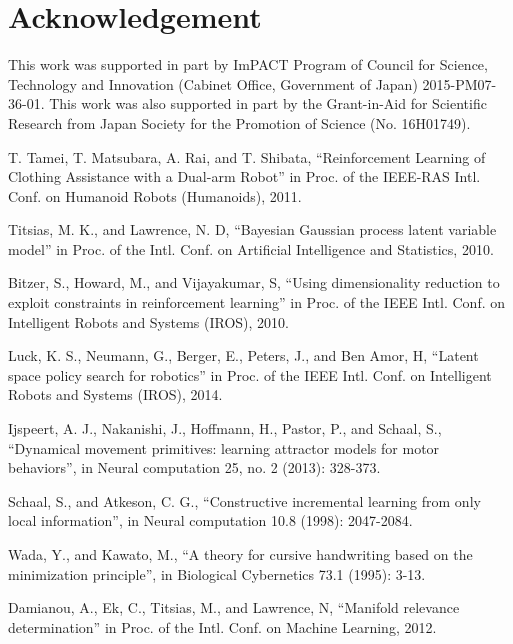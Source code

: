 \documentclass{article}
\begin{document}
\section*{Acknowledgement}
This work was supported in part by ImPACT Program of Council for Science, Technology and Innovation (Cabinet Office, Government of Japan) 2015-PM07-36-01. This work was also supported in part by the Grant-in-Aid for Scientific Research from Japan Society for the Promotion of Science (No. 16H01749).

\small

\begin{thebibliography}{15}
T. Tamei, T. Matsubara, A. Rai, and T. Shibata, ``Reinforcement Learning of Clothing Assistance with a Dual-arm Robot'' in Proc. of the IEEE-RAS Intl. Conf. on Humanoid Robots (Humanoids), 2011.

Titsias, M. K., and Lawrence, N. D, ``Bayesian Gaussian process latent variable model'' in Proc. of the Intl. Conf. on Artificial Intelligence and Statistics, 2010.

Bitzer, S., Howard, M., and Vijayakumar, S, ``Using dimensionality reduction to exploit constraints in reinforcement learning'' in Proc. of the IEEE Intl. Conf. on Intelligent Robots and Systems (IROS), 2010.

Luck, K. S., Neumann, G., Berger, E., Peters, J., and Ben Amor, H, ``Latent space policy search for robotics'' in Proc. of the IEEE Intl. Conf. on Intelligent Robots and Systems (IROS), 2014.

Ijspeert, A. J., Nakanishi, J., Hoffmann, H., Pastor, P., and Schaal, S., ``Dynamical movement primitives: learning attractor models for motor behaviors'', in Neural computation 25, no. 2 (2013): 328-373.

Schaal, S., and Atkeson, C. G., ``Constructive incremental learning from only local information'', in Neural computation 10.8 (1998): 2047-2084.

Wada, Y., and Kawato, M., ``A theory for cursive handwriting based on the minimization principle'', in Biological Cybernetics 73.1 (1995): 3-13.

Damianou, A., Ek, C., Titsias, M., and Lawrence, N, ``Manifold relevance determination'' in Proc. of the Intl. Conf. on Machine Learning, 2012.

\end{thebibliography}
\end{document}
